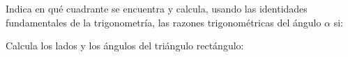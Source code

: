 \documentclass[addpoints,spanish, 12pt,a4paper]{exam}
\begin{document}
\begin{questions}
\question Indica en qué cuadrante se encuentra y calcula, usando las identidades fundamentales de la trigonometría, las razones trigonométricas del ángulo $\alpha$ si: 


\question Calcula los lados y los ángulos del triángulo rectángulo:
\begin{parts} 

\end{parts}
\end{questions}
\end{document}
